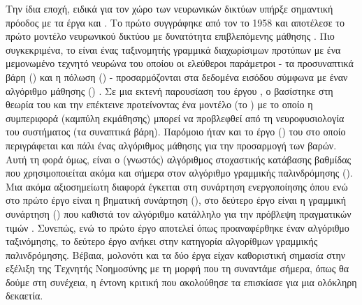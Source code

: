 Την ίδια εποχή, ειδικά για τον χώρο των νευρωνικών δικτύων υπήρξε σημαντική πρόοδος με τα έργα  και . Το πρώτο συγγράφηκε από τον  το 1958 και αποτέλεσε το πρώτο μοντέλο νευρωνικού δικτύου με δυνατότητα επιβλεπόμενης μάθησης . Πιο συγκεκριμένα, το  είναι ένας ταξινομητής γραμμικά διαχωρίσιμων προτύπων με ένα μεμονωμένο τεχνητό νευρώνα του οποίου οι ελεύθεροι παράμετροι - τα προσυναπτικά βάρη () και η πόλωση () - προσαρμόζονται στα δεδομένα εισόδου σύμφωνα με έναν αλγόριθμο μάθησης () \cite{haykin2009neural}. Σε μια εκτενή παρουσίαση του έργου \cite{rosenblatt1958perceptron}, ο  βασίστηκε στη θεωρία του  και την επέκτεινε προτείνοντας ένα μοντέλο (το ) με το οποίο η συμπεριφορά (καμπύλη εκμάθησης) μπορεί να προβλεφθεί από τη νευροφυσιολογία του συστήματος (τα συναπτικά βάρη). Παρόμοιο ήταν και το έργο  () του  στο οποίο περιγράφεται και πάλι ένας αλγόριθμος μάθησης για την προσαρμογή των βαρών. Αυτή τη φορά όμως, είναι ο (γνωστός) αλγόριθμος στοχαστικής κατάβασης βαθμίδας  που χρησιμοποιείται ακόμα και σήμερα στον αλγόριθμο γραμμικής παλινδρόμησης (). Μια ακόμα αξιοσημείωτη διαφορά έγκειται στη συνάρτηση ενεργοποίησης όπου ενώ στο πρώτο έργο είναι η βηματική συνάρτηση (), στο δεύτερο έργο είναι η γραμμική συνάρτηση () που καθιστά τον αλγόριθμο κατάλληλο για την πρόβλεψη πραγματικών τιμών \cite{goodfellow2016deep, vinhas_2021}. Συνεπώς, ενώ το πρώτο έργο αποτελεί όπως προαναφέρθηκε έναν αλγόριθμο ταξινόμησης, το δεύτερο έργο ανήκει στην κατηγορία αλγορίθμων γραμμικής παλινδρόμησης. Βέβαια, μολονότι και τα δύο έργα είχαν καθοριστική σημασία στην εξέλιξη της Τεχνητής Νοημοσύνης με τη μορφή που τη συναντάμε σήμερα, όπως θα δούμε στη συνέχεια, η έντονη κριτική που ακολούθησε τα επισκίασε για μια ολόκληρη δεκαετία.
\par

